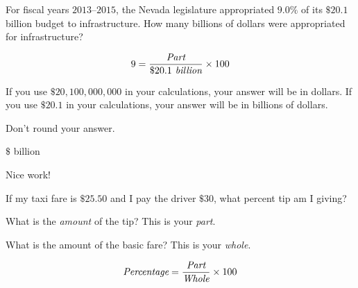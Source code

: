 \documentclass{ximera}
\begin{document}
\begin{question}
For fiscal years $2013$--$2015$, the Nevada legislature appropriated $9.0\%$ of its $\$20.1$ billion budget to infrastructure. How many billions of dollars were appropriated for infrastructure? 	

\begin{solution}
\begin{hint}
\begin{equation*}9=\frac{\emph{\text{Part}}}{\$20.1\emph{\text{ billion}}}\times 100\end{equation*}
\end{hint}
\begin{hint}
If you use $\$20,100,000,000$ in your calculations, your answer will be in dollars. If you use $\$20.1$ in your calculations, your answer will be in billions of dollars.
\end{hint}
\begin{hint}
Don't round your answer.
\end{hint}
$\$$ billion
\end{solution}	

Nice work!
\end{question}

\begin{question}
If my taxi fare is $\$25.50$ and I pay the driver $\$30$, what percent tip am I giving?
  \begin{solution}
    \begin{multiple-choice}
    \end{multiple-choice}
    \begin{hint}
    What is the \emph{amount} of the tip? This is your \emph{part}.
    \end{hint}
    \begin{hint}
   What is the amount of the basic fare? This is your \emph{whole}.
    \end{hint}
  	\begin{hint}
    \begin{equation*}\emph{\text{Percentage}}=\frac{\emph{\text{Part}}}{\emph{\text{Whole}}}\times 100\end{equation*}
    \end{hint}
  \end{solution}
\end{question}
\end{document}
